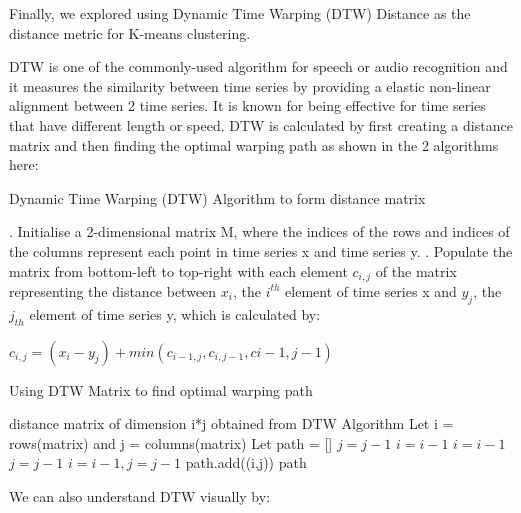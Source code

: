 \documentclass[12pt, letterpaper] {article}
\begin{document}
Finally, we explored using Dynamic Time Warping (DTW) Distance as the distance metric for K-means clustering. 

\noindent DTW is one of the commonly-used algorithm for speech or audio recognition and it measures the similarity between time series by providing a elastic non-linear alignment between 2 time series. It is known for being effective for time series that have different length or speed. DTW is calculated by first creating a distance matrix and then finding the optimal warping path as shown in the 2 algorithms here:

\begin{algorithm}[H]
\caption{Dynamic Time Warping (DTW) Algorithm to form distance matrix}
\begin{algorithmic}
\STATE 
{}. Initialise a 2-dimensional matrix M, where the indices of the rows and indices of the columns represent each point in time series x and time series y. 
. Populate the matrix from bottom-left to top-right with each element $c_{i,j}$ of the matrix representing the distance between $x_i$, the $i^{th}$ element of time series x and $y_j$, the $j_{th}$ element of time series y, which is calculated by:

\begin{center}
$c_{i,j} = (x_i - y_j) + min(c_{i-1,j}, c_{i,j-1}, c{i-1,j-1})$
\end{center}

\end{algorithmic}
\end{algorithm}

\begin{algorithm}[H]
\caption{Using DTW Matrix to find optimal warping path}
\begin{algorithmic}
\REQUIRE distance matrix of dimension i*j obtained from DTW Algorithm
\STATE Let i = rows(matrix) and j = columns(matrix)
\STATE Let path = []
\STATE $j = j-1$
\STATE $i = i-1$
\ELSE
{}
\STATE $i = i - 1$
\STATE $j = j - 1$
\ELSE
\STATE $i = i - 1, j = j - 1$
\ENDIF
path.add((i,j))
\ENDIF
\ENDWHILE
\RETURN path
\end{algorithmic}
\end{algorithm}


\newpage
\noindent We can also understand DTW visually by:
\end{document}
